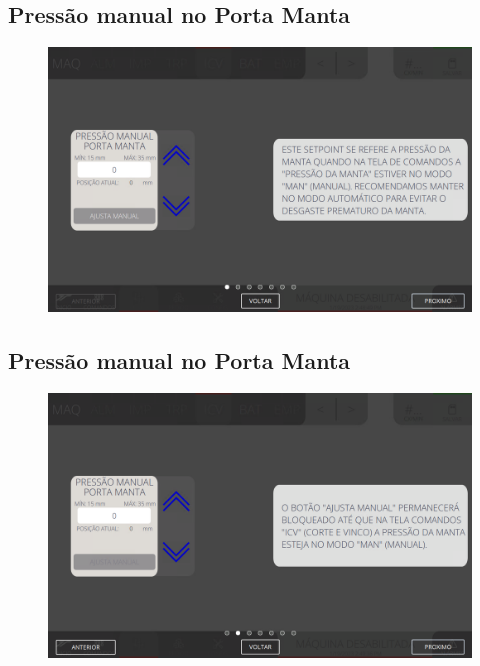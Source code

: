 \thispagestyle{fancy}
\vspace*{40 pt}
\subsection{Pressão manual no Porta Manta}
\vspace*{\fill}
\begin{figure}[h]
    \centering
    \includegraphics[width=480 px,height=300 px]{src/imagesICV/06-dryCutter/settings/e-1.png}
\end{figure}
\vspace*{\fill}

\newpage
\thispagestyle{fancy}
\vspace*{40 pt}
\subsection{Pressão manual no Porta Manta}
\vspace*{\fill}
\begin{figure}[h]
    \centering
    \includegraphics[width=576 px,height=360 px]{src/imagesICV/06-dryCutter/settings/e-2.png}
\end{figure}
\vspace*{\fill}

